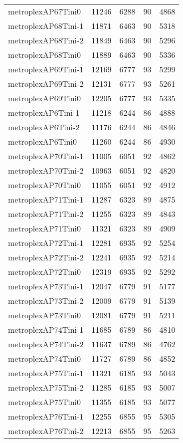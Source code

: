 \begin{longtable}{lrrrr}
metroplexAP67Tini0 & 11246 & 6288 & 90 & 4868 \\
metroplexAP68Tini-1 & 11871 & 6463 & 90 & 5318 \\
metroplexAP68Tini-2 & 11849 & 6463 & 90 & 5296 \\
metroplexAP68Tini0 & 11889 & 6463 & 90 & 5336 \\
metroplexAP69Tini-1 & 12169 & 6777 & 93 & 5299 \\
metroplexAP69Tini-2 & 12131 & 6777 & 93 & 5261 \\
metroplexAP69Tini0 & 12205 & 6777 & 93 & 5335 \\
metroplexAP6Tini-1 & 11218 & 6244 & 86 & 4888 \\
metroplexAP6Tini-2 & 11176 & 6244 & 86 & 4846 \\
metroplexAP6Tini0 & 11260 & 6244 & 86 & 4930 \\
metroplexAP70Tini-1 & 11005 & 6051 & 92 & 4862 \\
metroplexAP70Tini-2 & 10963 & 6051 & 92 & 4820 \\
metroplexAP70Tini0 & 11055 & 6051 & 92 & 4912 \\
metroplexAP71Tini-1 & 11287 & 6323 & 89 & 4875 \\
metroplexAP71Tini-2 & 11255 & 6323 & 89 & 4843 \\
metroplexAP71Tini0 & 11321 & 6323 & 89 & 4909 \\
metroplexAP72Tini-1 & 12281 & 6935 & 92 & 5254 \\
metroplexAP72Tini-2 & 12241 & 6935 & 92 & 5214 \\
metroplexAP72Tini0 & 12319 & 6935 & 92 & 5292 \\
metroplexAP73Tini-1 & 12047 & 6779 & 91 & 5177 \\
metroplexAP73Tini-2 & 12009 & 6779 & 91 & 5139 \\
metroplexAP73Tini0 & 12081 & 6779 & 91 & 5211 \\
metroplexAP74Tini-1 & 11685 & 6789 & 86 & 4810 \\
metroplexAP74Tini-2 & 11637 & 6789 & 86 & 4762 \\
metroplexAP74Tini0 & 11727 & 6789 & 86 & 4852 \\
metroplexAP75Tini-1 & 11321 & 6185 & 93 & 5043 \\
metroplexAP75Tini-2 & 11285 & 6185 & 93 & 5007 \\
metroplexAP75Tini0 & 11355 & 6185 & 93 & 5077 \\
metroplexAP76Tini-1 & 12255 & 6855 & 95 & 5305 \\
metroplexAP76Tini-2 & 12213 & 6855 & 95 & 5263 \\

\end{longtable}
